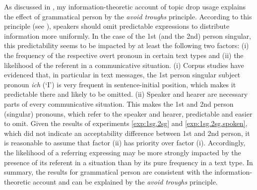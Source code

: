 As discussed in , my information-theoretic account of topic drop usage explains the effect of grammatical person by the \textit{avoid troughs} principle.
According to this principle (see ), speakers should omit predictable expressions to distribute information more uniformly.
In the case of the 1st (and the 2nd) person singular, this predictability  seems to be impacted by at least the following two factors:
(i) the frequency of the respective overt pronoun in certain text types and (ii) the likelihood of the referent in a communicative situation.
(i) Corpus studies  have evidenced that, in particular in text messages, the 1st person singular subject pronoun \textit{ich} (`I') is very frequent in sentence-initial position, which makes it predictable there and likely to be omitted. 
(ii) Speaker and hearer are necessary parts of every communicative situation.
This makes the 1st and 2nd person (singular) pronouns, which refer to the speaker and hearer, predictable  and easier to omit.
Given the results of experiments \ref*{exp:1sg.2sg} and \ref*{exp:1sg.2sg.spoken}, which did not indicate an acceptability difference between 1st and 2nd person, it is reasonable to assume that factor (ii) has priority over factor (i).
Accordingly, the likelihood of a referring expressing may be more strongly impacted by the presence of its referent in a situation than by its pure frequency in a text type.
In summary, the results for grammatical person are consistent with the information-theoretic account and can be explained by the \textit{avoid troughs} principle.

